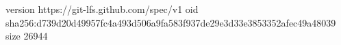 version https://git-lfs.github.com/spec/v1
oid sha256:d739d20d49957fc4a493d506a9fa583f937de29e3d33e3853352afec49a48039
size 26944

